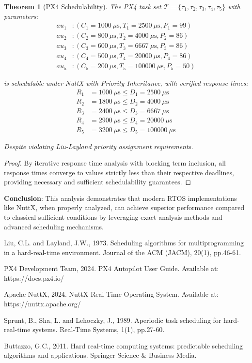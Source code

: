 \documentclass[12pt,a4paper]{article}
\newtheorem{theorem}{Theorem}
\begin{document}
\begin{theorem}[PX4 Schedulability]

The PX4 task set $\mathcal{T} = \{\tau_1, \tau_2, \tau_3, \tau_4, \tau_5\}$ with parameters:
\begin{align*}
	au_1 &: (C_1=1000\ \mu\text{s}, T_1=2500\ \mu\text{s}, P_1=99) \\
	au_2 &: (C_2=800\ \mu\text{s}, T_2=4000\ \mu\text{s}, P_2=86) \\
	au_3 &: (C_3=600\ \mu\text{s}, T_3=6667\ \mu\text{s}, P_3=86) \\
	au_4 &: (C_4=500\ \mu\text{s}, T_4=20000\ \mu\text{s}, P_4=86) \\
	au_5 &: (C_5=200\ \mu\text{s}, T_5=100000\ \mu\text{s}, P_5=50)
\end{align*}

is schedulable under NuttX with Priority Inheritance, with verified response times:
\begin{align*}
R_1 &= 1000\ \mu\text{s} \leq D_1 = 2500\ \mu\text{s} \\
R_2 &= 1800\ \mu\text{s} \leq D_2 = 4000\ \mu\text{s} \\
R_3 &= 2400\ \mu\text{s} \leq D_3 = 6667\ \mu\text{s} \\
R_4 &= 2900\ \mu\text{s} \leq D_4 = 20000\ \mu\text{s} \\
R_5 &= 3200\ \mu\text{s} \leq D_5 = 100000\ \mu\text{s}
\end{align*}

Despite violating Liu-Layland priority assignment requirements.
\end{theorem}

\begin{proof}
By iterative response time analysis with blocking term inclusion, all response times converge to values strictly less than their respective deadlines, providing necessary and sufficient schedulability guarantees.
\end{proof}

\textbf{Conclusion}: This analysis demonstrates that modern RTOS implementations like NuttX, when properly analyzed, can achieve superior performance compared to classical sufficient conditions by leveraging exact analysis methods and advanced scheduling mechanisms.

\begin{thebibliography}{9}
Liu, C.L. and Layland, J.W., 1973. Scheduling algorithms for multiprogramming in a hard-real-time environment. Journal of the ACM (JACM), 20(1), pp.46-61.

PX4 Development Team, 2024. PX4 Autopilot User Guide. Available at: https://docs.px4.io/

Apache NuttX, 2024. NuttX Real-Time Operating System. Available at: https://nuttx.apache.org/

Sprunt, B., Sha, L. and Lehoczky, J., 1989. Aperiodic task scheduling for hard-real-time systems. Real-Time Systems, 1(1), pp.27-60.

Buttazzo, G.C., 2011. Hard real-time computing systems: predictable scheduling algorithms and applications. Springer Science \& Business Media.
\end{thebibliography}
\end{document}
